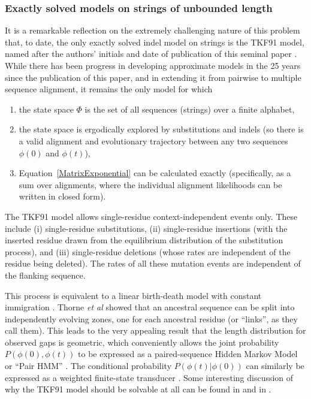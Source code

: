 \documentclass{bmcart}
\newcommand{\eqref}[1]{Equation~\ref{#1}}
\newcommand{\statespace}{\Phi}
\newcommand{\state}{\phi}
\begin{document}
\subsubsection*{Exactly solved models on strings of unbounded length}

It is a remarkable reflection on the extremely challenging nature of this problem
that, to date, the only exactly solved indel model on strings
is the TKF91 model, named after the authors' initials and date of publication
of this seminal paper \cite{ThorneEtal91}.
While there has been progress in developing approximate models in the 25 years since the publication of this paper,
and in extending it from pairwise to multiple sequence alignment,
it remains the only model for which
\begin{enumerate}
\item the state space $\statespace$ is the set of all sequences (strings) over a finite alphabet,
\item the state space is ergodically explored by substitutions and indels
(so there is a valid alignment and evolutionary trajectory between any two sequences $\state(0)$ and $\state(t)$),
\item \eqref{MatrixExponential} can be calculated exactly
 (specifically, as a sum over alignments,
  where the individual alignment likelihoods can be written in closed form).
\end{enumerate}

The TKF91 model allows single-residue context-independent events only.
These include (i) single-residue substitutions,
(ii) single-residue insertions (with the inserted residue drawn from the equilibrium distribution
of the substitution process), and
(iii) single-residue deletions (whose rates are independent of the residue being deleted).
The rates of all these mutation events are independent of the flanking sequence.

This process is equivalent to a linear birth-death model with constant immigration
\cite{Feller71}.
Thorne {\em et al} showed that 
an ancestral sequence can be split into independently evolving zones, one for each ancestral residue
(or ``links'', as they call them).
This leads to the very appealing result that the length distribution for observed gaps is geometric,
which conveniently allows the joint probability $P(\state(0),\state(t))$ to be expressed
as a paired-sequence Hidden Markov Model or ``Pair HMM'' \cite{HolmesBruno2001}.
The conditional probability $P(\state(t)|\state(0))$
can similarly be expressed as a weighted finite-state transducer \cite{Holmes2003,WestessonEtAl2012,BouchardCote2013}.
Some interesting discussion of why the TKF91 model should be solvable at all can be found in
\cite{Metzler2003} and in \cite{pmid22644340}.
\end{document}
